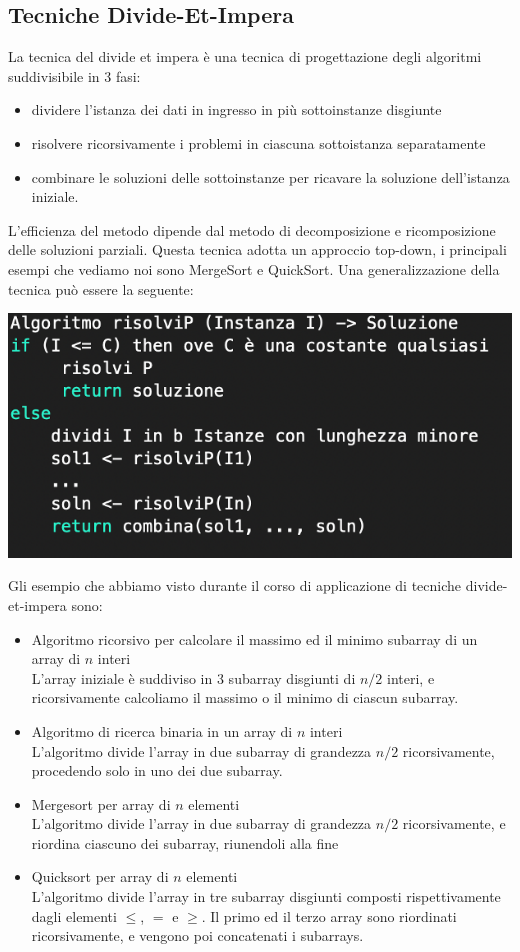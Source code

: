 \documentclass[11pt, oneside]{article}   	%
\begin{document}
\subsection{Tecniche Divide-Et-Impera}
La tecnica del divide et impera è una tecnica di progettazione degli algoritmi suddivisibile in 3 fasi:
\begin{itemize}
\item dividere l'istanza dei dati in ingresso in più sottoinstanze disgiunte
\item risolvere ricorsivamente i problemi in ciascuna sottoistanza separatamente
\item combinare le soluzioni delle sottoinstanze per ricavare la soluzione dell'istanza iniziale.
\end{itemize}
L'efficienza del metodo dipende dal metodo di decomposizione e ricomposizione delle soluzioni parziali. Questa tecnica adotta un approccio top-down, i principali esempi che vediamo noi sono MergeSort e QuickSort. Una generalizzazione della tecnica può essere la seguente:
\begin{center}
\includegraphics[scale=0.8]{divide}
\end{center}
Gli esempio che abbiamo visto durante il corso di applicazione di tecniche divide-et-impera sono:
\begin{itemize}
\item Algoritmo ricorsivo per calcolare il massimo ed il minimo subarray di un array di $n$ interi\\
L'array iniziale è suddiviso in 3 subarray disgiunti di $n/2$ interi, e ricorsivamente calcoliamo il massimo o il minimo di ciascun subarray.
\item Algoritmo di ricerca binaria in un array di $n$ interi\\
L'algoritmo divide l'array in due subarray di grandezza $n/2$ ricorsivamente, procedendo solo in uno dei due subarray.
\item Mergesort per array di $n$ elementi\\
L'algoritmo divide l'array in due subarray di grandezza $n/2$ ricorsivamente, e riordina ciascuno dei subarray, riunendoli alla fine
\item Quicksort per array di $n$ elementi\\
L'algoritmo divide l'array in tre subarray disgiunti composti rispettivamente dagli elementi $\leq$, $=$ e $\geq$. Il primo ed il terzo array sono riordinati ricorsivamente, e vengono poi concatenati i subarrays. 
\end{itemize}
\end{document}
